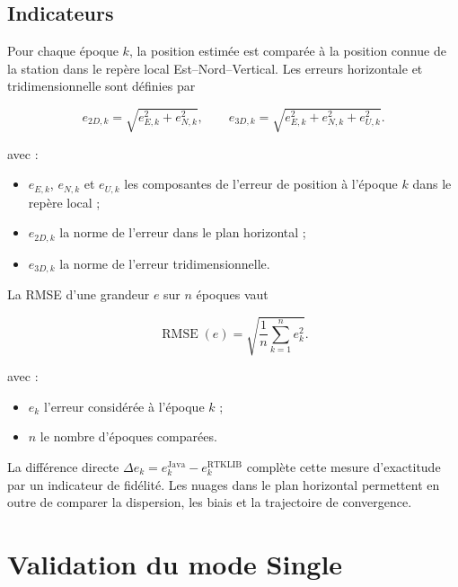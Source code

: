 \subsection{Indicateurs}

Pour chaque époque $k$, la position estimée est comparée à la position connue
de la station dans le repère local Est--Nord--Vertical. Les erreurs horizontale
et tridimensionnelle sont définies par

\begin{equation}
e_{2D,k}=\sqrt{e_{E,k}^{2}+e_{N,k}^{2}},
\qquad
e_{3D,k}=\sqrt{e_{E,k}^{2}+e_{N,k}^{2}+e_{U,k}^{2}}.
\label{eq:validation_errors}
\end{equation}

avec :

\begin{itemize}
    \item $e_{E,k}$, $e_{N,k}$ et $e_{U,k}$ les composantes de l'erreur de
    position à l'époque $k$ dans le repère local ;
    \item $e_{2D,k}$ la norme de l'erreur dans le plan horizontal ;
    \item $e_{3D,k}$ la norme de l'erreur tridimensionnelle.
\end{itemize}

La RMSE d'une grandeur $e$ sur $n$ époques vaut

\begin{equation}
\operatorname{RMSE}(e)=
\sqrt{\frac{1}{n}\sum_{k=1}^{n}e_k^2}.
\label{eq:validation_rmse}
\end{equation}

avec :

\begin{itemize}
    \item $e_k$ l'erreur considérée à l'époque $k$ ;
    \item $n$ le nombre d'époques comparées.
\end{itemize}

La différence directe
$\Delta e_k=e_k^{\mathrm{Java}}-e_k^{\mathrm{RTKLIB}}$ complète cette mesure
d'exactitude par un indicateur de fidélité. Les nuages dans le plan horizontal
permettent en outre de comparer la dispersion, les biais et la trajectoire de
convergence.

\section{Validation du mode Single}
\label{sec:validation_wls}

